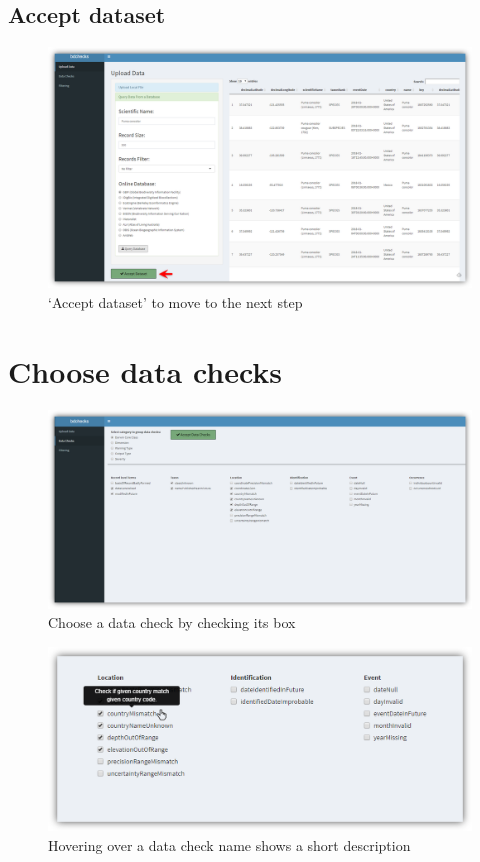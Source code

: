\documentclass[]{book}
\theoremstyle{definition}
\theoremstyle{definition}
\theoremstyle{definition}
\theoremstyle{remark}
\begin{document}
\subsection{Accept dataset}\label{accept-dataset}

\begin{figure}
\centering
\includegraphics{img/bdchecks_accept_dataset.png}
\caption{`Accept dataset' to move to the next step}
\end{figure}

\section{Choose data checks}\label{choose-data-checks}

\begin{figure}
\centering
\includegraphics{img/bdchecks_choose_DC.png}
\caption{Choose a data check by checking its box}
\end{figure}

\begin{figure}
\centering
\includegraphics{img/bdchecks_hover.png}
\caption{Hovering over a data check name shows a short description}
\end{figure}
\end{document}
